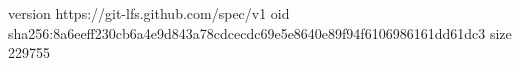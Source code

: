 version https://git-lfs.github.com/spec/v1
oid sha256:8a6eeff230cb6a4e9d843a78cdcecdc69e5e8640e89f94f6106986161dd61dc3
size 229755
